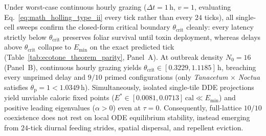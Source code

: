 Under worst-case continuous hourly grazing ($\Delta t = 1\,\text{h}$, $v = 1$, evaluating Eq.~\eqref{eq:math_holling_type_ii} every tick rather than every $24$ ticks), all single-cell sweeps confirm the closed-form critical boundary $\theta_{\text{crit}}$ cleanly: every latency strictly below $\theta_{\text{crit}}$ preserves foliar survival until toxin deployment, whereas delays above $\theta_{\text{crit}}$ collapse to $E_{\min}$ on the exact predicted tick (Table~\ref{tab:ecotone_theorem_parity}, Panel~A). At outbreak density $N_0 = 16$ (Panel~B), continuous hourly grazing yields $\theta_{\text{crit}} \in [0.3229, 1.1185]\,\text{h}$, breaching every unprimed delay and $9/10$ primed configurations (only \textit{Tanacetum} $\times$ \textit{Noctua} satisfies $\theta_{\mathrm{p}} = 1 < 1.0349\,\text{h}$). Simultaneously, isolated single-tile DDE projections yield unviable caloric fixed points ($E^* \in [0.0081, 0.0713]\,\text{cal} \ll E_{\min}$) and positive leading eigenvalues ($\alpha > 0$) even at $\tau = 0$. Consequently, full-lattice $10/10$ coexistence does not rest on local ODE equilibrium stability, instead emerging from $24$-tick diurnal feeding strides, spatial dispersal, and repellent eviction.


